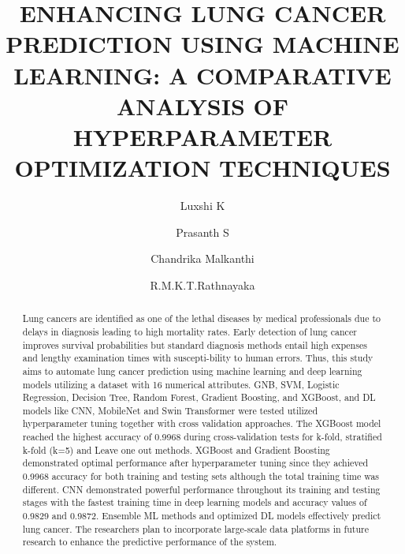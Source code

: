 \documentclass[runningheads]{llncs}
\begin{document}
%
\title{ENHANCING LUNG CANCER PREDICTION USING MACHINE LEARNING: A COMPARATIVE ANALYSIS OF HYPERPARAMETER OPTIMIZATION TECHNIQUES}
%
%
\author{Luxshi K \and
Prasanth S \and
Chandrika Malkanthi  \and
R.M.K.T.Rathnayaka }
%
%
%
\maketitle             %
%
\begin{abstract}
Lung cancers are identified as one of the lethal diseases by medical professionals due to delays in diagnosis leading to high mortality rates. Early detection of lung cancer improves survival probabilities but standard diagnosis methods entail high expenses and lengthy examination times with suscepti-bility to human errors. Thus, this study aims to automate lung cancer prediction using machine learning and deep learning models utilizing a dataset with 16 numerical attributes. GNB, SVM, Logistic Regression, Decision Tree, Random Forest, Gradient Boosting, and XGBoost, and DL models like CNN, MobileNet and Swin Transformer were tested utilized hyperparameter tuning together with cross validation approaches. The XGBoost model reached the highest accuracy of 0.9968 during cross-validation tests for k-fold, stratified k-fold (k=5) and Leave one out methods. XGBoost and Gradient Boosting demonstrated optimal performance after hyperparameter tuning since they achieved 0.9968 accuracy for both training and testing sets although the total training time was different. CNN demonstrated powerful performance throughout its training and testing stages with the fastest training time in deep learning models and accuracy values of 0.9829 and 0.9872. Ensemble ML methods and optimized DL models effectively predict lung cancer. The researchers plan to incorporate large-scale data platforms in future research to enhance the predictive performance of the system.

\end{abstract}
%
%
%
\end{document}
